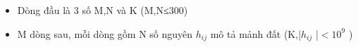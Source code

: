 \begin{itemize}
	\item     Dòng đầu là 3 số M,N và  K (M,N≤300)   
	\item     M dòng sau, mỗi dòng gồm N số nguyên $h_{ij}$    mô tả mảnh đất (K,|$h_{ij}$    |$<$$10^{9}$    )   
\end{itemize}